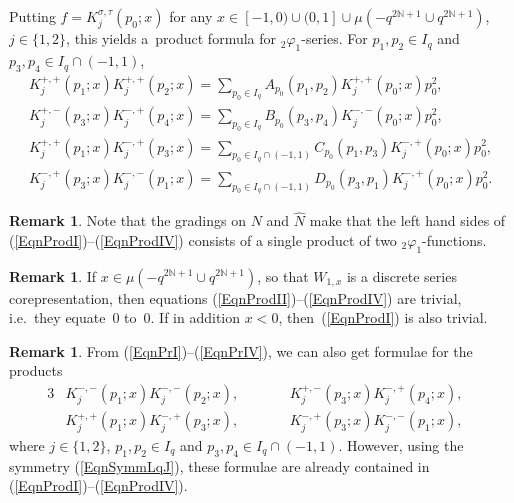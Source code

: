 \documentclass[pdftex]{sigma}
\numberwithin{equation}{section}
\theoremstyle{definition}
\newtheorem{rmk}[thm]{Remark}
\begin{document}
Putting   $f = K_j^{\sigma, \tau}(p_0 ;x)$ for any $x \in [-1,0) \cup (0,1] \cup \mu(-q^{2\mathbb{N}+1} \cup q^{2\mathbb{N}+1} )$, $j \in \{1,2\}$, this
yields a~product formula for $_2 \varphi_1$-series. For $p_1, p_2 \in I_q$ and $p_3, p_4 \in I_q \cap (-1,1)$,
\begin{gather}
K_j^{+, +}(p_1 ;x) K_j^{+, +}(p_2 ;x)   =   \sum_{p_0 \in
I_q} A_{p_0}(p_1, p_2)K_j^{+, +}(p_0 ;x) p_0^2, \label{EqnProdI} \\
K_j^{+, -}(p_3 ;x) K_j^{-, +}(p_4 ;x)    =   \sum_{p_0 \in
I_q} B_{p_0}(p_3, p_4) K_j^{-, -}(p_0 ;x) p_0^2, \label{EqnProdII} \\
K_j^{+, +}(p_1 ;x) K_j^{-, +}(p_3 ;x)   =   \sum_{p_0 \in
I_q \cap (-1,1)} C_{p_0}(p_1, p_3) K^{-,+}_{j}(p_0; x) p_0^2,  \\
K_j^{-, +}(p_3 ;x) K_j^{-, -}(p_1 ;x)    =   \sum_{p_0 \in
I_q \cap (-1,1)} D_{p_0}(p_3, p_1) K_j^{-, +}(p_0 ;x) p_0^2. \label{EqnProdIV}
\end{gather}
\begin{rmk}
Note that the gradings on $N$ and $\hat{N}$ make that the left hand sides of (\ref{EqnProdI})--(\ref{EqnProdIV}) consists of a single product of two $_2 \varphi_1$-functions.
\end{rmk}

\begin{rmk}
If $x \in \mu(-q^{2\mathbb{N}+1} \cup q^{2\mathbb{N}+1})$, so that $W_{1,x}$ is a discrete series corepresentation, then equations (\ref{EqnProdII})--(\ref{EqnProdIV}) are trivial, i.e.\ they equate~0 to~0.
 If in addition $x <0$, then~(\ref{EqnProdI}) is also trivial.
\end{rmk}
\begin{rmk}
From (\ref{EqnPrI})--(\ref{EqnPrIV}), we can also get formulae for the products
\begin{alignat*}{3}
& K_j^{-, -}(p_1 ;x) K_j^{-, -}(p_2 ;x), \qquad && K_j^{+, -}(p_3 ;x) K_j^{-, +}(p_4 ;x),&\\
& K_j^{+, +}(p_1 ;x) K_j^{-, +}(p_3 ;x),\qquad && K_j^{-, +}(p_3 ;x) K_j^{-, -}(p_1 ;x),&
\end{alignat*}
where  $j \in \{1, 2\}$, $p_1, p_2 \in I_q$ and $p_3, p_4 \in I_q \cap (-1,1)$. However, using the symmetry (\ref{EqnSymmLqJ}), these formulae  are already contained in (\ref{EqnProdI})--(\ref{EqnProdIV}).
\end{rmk}
\end{document}
